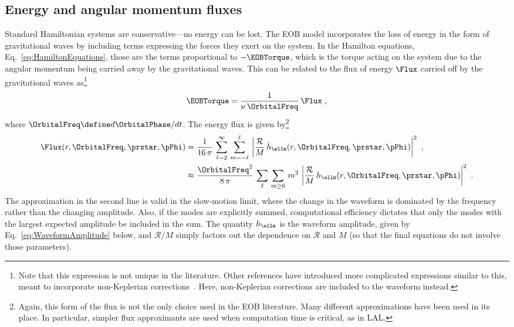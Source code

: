 \documentclass[twoside, aps, prd, letterpaper, noshowpacs, %
amsmath, amssymb, amsfonts, nofootinbib, floatfix, notitlepage]%
{revtex4-1}
\begin{document}
\subsection{Energy and angular momentum fluxes}
Standard Hamiltonian systems are conservative---no energy can be lost.
The EOB model incorporates the loss of energy in the form of
gravitational waves by including terms expressing the forces they
exert on the system.  In the Hamilton equations,
Eq.~\eqref{eq:HamiltonEquations}, those are the terms proportional to
$-\EOBTorque$, which is the torque acting on the system due to the
angular momentum being carried away by the gravitational waves.  This
can be related to the flux of energy $\Flux$ carried off by the
gravitational waves as\footnote{Note that this expression is not
  unique in the literature.  Other references have introduced more
  complicated expressions similar to this, meant to incorporate
  non-Keplerian corrections~\cite{DamourEtAl:1998}.  Here,
  non-Keplerian corrections are included to the waveform instead.}
\begin{equation}
  \label{eq:TorqueAndFlux}
  \EOBTorque = \frac{1}{\nu\, \OrbitalFreq}\, \Flux~,
\end{equation}
where $\OrbitalFreq \define d\OrbitalPhase / dt$.  The energy flux is
given by\footnote{Again, this form of the flux is not the only choice
  used in the EOB literature.  Many different approximations have been
  used in its place.  In particular, simpler flux approximants are
  used when computation time is critical, as in LAL.}
\begin{subequations}
  \label{eq:Flux}
  \begin{align}
  \label{eq:FluxExact}
    \Flux(r, \OrbitalFreq, \prstar, \pPhi) &= \frac{1}{16\, \pi}\,
    \sum_{\ell=2}^{\infty}\, \sum_{m=-\ell}^{\ell}\,
    \abs{\frac{\mathcal{R}}{M}\, \dot{h}_{\ellm} (r, \OrbitalFreq,
      \prstar, \pPhi)}^{2}~,
    \\ \label{eq:FluxApprox}
    & \approx \frac{\OrbitalFreq^{2}} {8\, \pi}\, \sum_{\ell}\,
    \sum_{m\geq 0}\, m^{2}\, \abs{ \frac{\mathcal{R}}{M}\, h_{\ellm}
      (r, \OrbitalFreq, \prstar, \pPhi)}^{2}~.
  \end{align}
\end{subequations}
The approximation in the second line is valid in the slow-motion
limit, where the change in the waveform is dominated by the frequency
rather than the changing amplitude.  Also, if the modes are explicitly
summed, computational efficiency dictates that only the modes with the
largest expected amplitude be included in the sum.  The quantity
$h_{\ellm}$ is the waveform amplitude, given by
Eq.~\eqref{eq:WaveformAmplitude} below, and $\mathcal{R}/M$ simply
factors out the dependence on $\mathcal{R}$ and $M$ (so that the final
equations do not involve those parameters).
\end{document}
